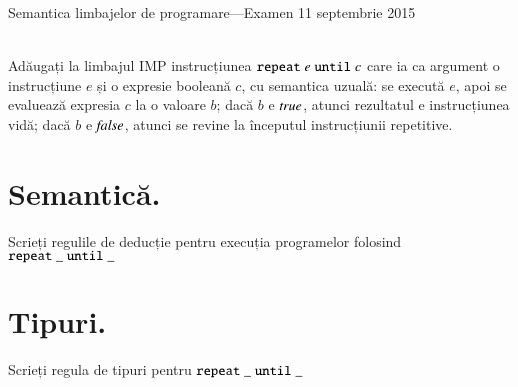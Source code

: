 \documentclass[addpoints,12pt,a4paper,answers]{exam}
\newcommand{\getHeight}[1]{%
}
\newenvironment{solutie}{\par\hspace*{-9em}\begin{minipage}{.98\paperwidth}
\hrulefill {\bf Rezolvare} \hrulefill}{\hrulefill\end{minipage}}
\begin{document}
\begin{center}


Semantica limbajelor de programare---Examen \hfill  11 septembrie 2015 \\ \ \\

\end{center}


\begin{questions}
Adăugați la limbajul IMP instrucțiunea $\mathrel{\text{\ttfamily repeat}} e \mathrel{\text{\ttfamily until}} c$ care ia ca argument o instrucțiune $e$ și o expresie booleană $c$, cu semantica uzuală: se execută $e$, apoi se evaluează expresia $c$ la o valoare $b$; dacă  $b$ e ${\it true}$, atunci rezultatul e instrucțiunea vidă; dacă $b$ e ${\it false}$, atunci se revine la începutul instrucțiunii repetitive.
\begin{parts}
\part[\half] {\bf Semantică. } Scrieți regulile de deducție pentru execuția programelor folosind $\mathrel{\text{\ttfamily repeat}}\_\mathrel{\text{\ttfamily until}}\_$ 
\getHeight{
\begin{solutie}
(0,25p/regulă)

\[
\reg[SwitchS]{
\Ss
{\c{\terminal{switch}(e)\{\terminal{case} v_1: e_1; \terminal{case} v_2: e_2; \terminal{default:} d\},s}}
{\c{\terminal{switch}(e')\{\terminal{case} v_1: e_1; \terminal{case} v_2: e_2; \terminal{default:} d\},s'}}
}{
\Ss
{\c{e,s}}
{\c{e',s'}}
}{}
\]
\[
\reg[Switch1]{
\Ss
{\c{\terminal{switch}(v)\{\terminal{case} v_1: e_1; \terminal{case} v_2: e_2; \terminal{default:} d\},s}}
{\c{e_1,s}}}{}{v=v_1}
\]
\[
\reg[Switch2]{
\Ss
{\c{\terminal{switch}(v)\{\terminal{case} v_1: e_1; \terminal{case} v_2: e_2; \terminal{default:} d\},s}}
{\c{e_2,s}}}{}{v\neq v_1, v = v_2}
\]
\[
\reg[Switch3]{
\Ss
{\c{\terminal{switch}(v)\{\terminal{case} v_1: e_1; \terminal{case} v_2: e_2; \terminal{default:} d\},s}}
{\c{d,s}}}{}{v\neq v_1, v \neq v_2}
\]
\end{solutie}
}
\part[\half] {\bf Tipuri. } Scrieți regula de tipuri pentru $\mathrel{\text{\ttfamily repeat}}\_\mathrel{\text{\ttfamily until}}\_$
\getHeight{
\begin{solutie}
(0,2p/câte au tipul la fel ca e sau câte au tipul la fel ca rezultatul)


\end{solutie}}
\end{parts}
\end{questions}
\end{document}
